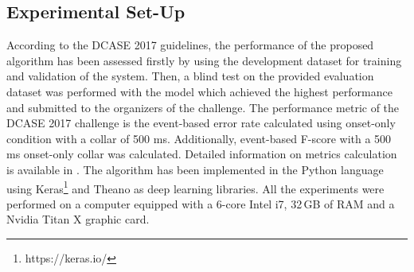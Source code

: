 \documentclass{article}
\begin{document}
\begin{sloppy}
\section{Experimental Set-Up}
\label{sec:experiment}
According to the DCASE 2017 guidelines, the performance of the proposed algorithm has been assessed firstly by using the development dataset for training and validation of the system. Then, a blind test on the provided evaluation dataset was performed with the model which achieved the highest performance and submitted to the organizers of the challenge. The performance metric of the DCASE 2017 challenge is the event-based error rate calculated using onset-only condition with a collar of 500 ms. Additionally, event-based F-score with a 500 ms onset-only collar was calculated. Detailed information on metrics calculation is available in \cite{Mesaros2016_MDPI}. The algorithm has been implemented in the Python language using Keras\footnote{https://keras.io/} and Theano \cite{Theano2016short} as deep learning libraries. All the experiments were performed on a computer equipped with a 6-core Intel i7, 32\,GB of RAM and a Nvidia Titan X graphic card.


\end{sloppy}
\end{document}
